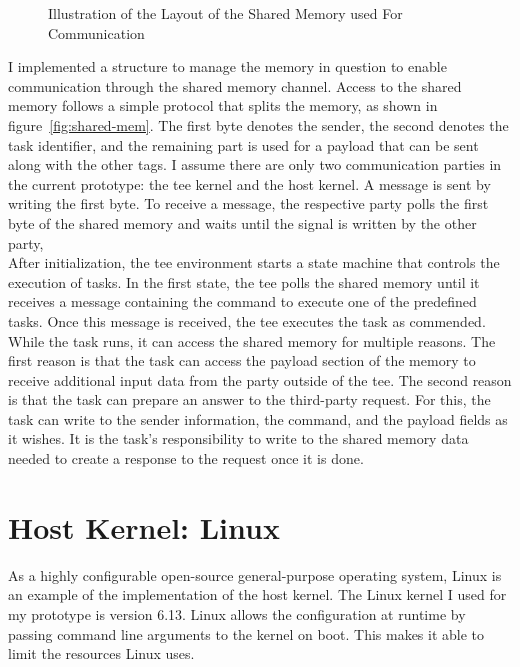 \begin{center}
    \begin{figure}
        \centering
        
        \caption{Illustration of the Layout of the Shared Memory used For Communication}
        \label{fig:state:technical:paging}
    \end{figure}
\end{center}

I implemented a structure to manage the memory in question to enable
communication through the shared memory channel. Access to the shared memory
follows a simple protocol that splits the memory, as shown in
figure~\ref{fig:shared-mem}. The first byte denotes the sender, the second
denotes the task identifier, and the remaining part is used for a payload that
can be sent along with the other tags. I assume there are only two communication
parties in the current prototype: the \gls{tee} kernel and the host kernel. A
message is sent by writing the first byte. To receive a message, the respective
party polls the first byte of the shared memory and waits until the signal is
written by the other party, \\

After initialization, the \gls{tee} environment starts a state machine that
controls the execution of tasks. In the first state, the \gls{tee} polls the
shared memory until it receives a message containing the command to execute one
of the predefined tasks. Once this message is received, the \gls{tee} executes
the task as commended. While the task runs, it can access the shared memory for
multiple reasons. The first reason is that the task can access the payload
section of the memory to receive additional input data from the party outside of
the \gls{tee}. The second reason is that the task can prepare an answer to the
third-party request. For this, the task can write to the sender information, the
command, and the payload fields as it wishes. It is the task's responsibility to
write to the shared memory data needed to create a response to the request once
it is done.

\section{Host Kernel: Linux}
\label{sec:implementation:hostKernel}

As a highly configurable open-source general-purpose operating system, Linux is
an example of the implementation of the host kernel. The Linux kernel I used for
my prototype is version 6.13. Linux allows the configuration at runtime by
passing command line arguments to the kernel on boot. This makes it able to
limit the resources Linux uses. \\

